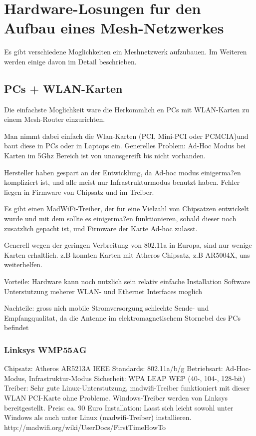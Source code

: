 \section{Hardware-Losungen fur den Aufbau eines Mesh-Netzwerkes}


Es gibt verschiedene Moglichkeiten ein Meshnetzwerk aufzubauen. Im Weiteren werden einige davon im Detail beschrieben. 

\subsection{PCs + WLAN-Karten}

Die einfachste Moglichkeit ware die Herkommlich en PCs mit WLAN-Karten zu einem Mesh-Router einzurichten. 

Man nimmt dabei einfach die Wlan-Karten (PCI, Mini-PCI oder PCMCIA)und baut diese in PCs oder in Laptops ein. 
Generelles Problem: 
 Ad-Hoc Modus bei Karten im 5Ghz Bereich ist von unausgereift bis nicht vorhanden. 

Hersteller haben gespart an der Entwicklung, da Ad-hoc modus einigerma?en kompliziert ist, und alle meist nur Infrastrukturmodus benutzt haben. Fehler liegen in Firmware von Chipsatz und im Treiber. 

Es gibt einen MadWiFi-Treiber, der fur eine Vielzahl von Chipsatzen entwickelt wurde und mit dem sollte es einigerma?en funktionieren, sobald dieser noch zusatzlich gepacht ist, und Firmware der Karte Ad-hoc zulasst. 

Generell wegen der geringen Verbreitung von 802.11a in Europa, sind nur wenige Karten erhaltlich. z.B konnten Karten mit Atheros Chipsatz, z.B AR5004X, uns weiterhelfen. 

Vorteile: 
Hardware kann noch nutzlich sein 
relativ einfache Installation 
Software Unterstutzung 
meherer WLAN- und Ethernet Interfaces moglich 

Nachteile: 
gross 
nich mobile 
Stromversorgung 
schlechte Sende- und Empfangqualitat, da die Antenne im elektromagnetischem Stornebel des PCs befindet 

\subsubsection{Linksys WMP55AG}
 
Chipsatz: 
 Atheros AR5213A
IEEE Standards: 
 802.11a/b/g
Betriebsart: 
 Ad-Hoc-Modus, Infrastruktur-Modus
Sicherheit: 
 WPA
 LEAP
 WEP (40-, 104-, 128-bit)
Treiber: 
 Sehr gute Linux-Unterstutzung, madwifi-Treiber funktioniert
 mit dieser WLAN PCI-Karte ohne Probleme.
 Windows-Treiber werden von Linksys bereitgestellt.
Preis: 
 ca. 90 Euro
Installation: 
 Lasst sich leicht sowohl unter Windows als auch unter Linux (madwifi-Treiber) installieren.
 http://madwifi.org/wiki/UserDocs/FirstTimeHowTo
